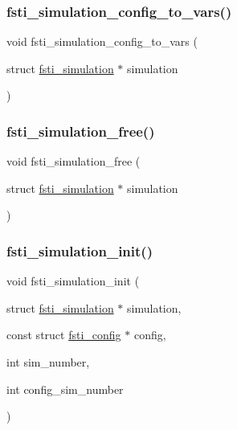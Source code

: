 \subsubsection{\texorpdfstring{fsti\+\_\+simulation\+\_\+config\+\_\+to\+\_\+vars()}{fsti\_simulation\_config\_to\_vars()}}
{\footnotesize\ttfamily void fsti\+\_\+simulation\+\_\+config\+\_\+to\+\_\+vars (\begin{DoxyParamCaption}\item[{struct \mbox{\hyperlink{structfsti__simulation}{fsti\+\_\+simulation}} $\ast$}]{simulation }\end{DoxyParamCaption})}

\mbox{\label{fsti-simulation_8h_ae29f6c96793ab175ff8021f853c0b898}} 
\subsubsection{\texorpdfstring{fsti\+\_\+simulation\+\_\+free()}{fsti\_simulation\_free()}}
{\footnotesize\ttfamily void fsti\+\_\+simulation\+\_\+free (\begin{DoxyParamCaption}\item[{struct \mbox{\hyperlink{structfsti__simulation}{fsti\+\_\+simulation}} $\ast$}]{simulation }\end{DoxyParamCaption})}

\mbox{\label{fsti-simulation_8h_a5e7080c9230e123dc212cc19bb209487}} 
\subsubsection{\texorpdfstring{fsti\+\_\+simulation\+\_\+init()}{fsti\_simulation\_init()}}
{\footnotesize\ttfamily void fsti\+\_\+simulation\+\_\+init (\begin{DoxyParamCaption}\item[{struct \mbox{\hyperlink{structfsti__simulation}{fsti\+\_\+simulation}} $\ast$}]{simulation,  }\item[{const struct \mbox{\hyperlink{structfsti__config}{fsti\+\_\+config}} $\ast$}]{config,  }\item[{int}]{sim\+\_\+number,  }\item[{int}]{config\+\_\+sim\+\_\+number }\end{DoxyParamCaption})}

